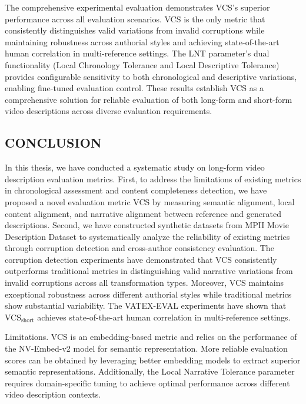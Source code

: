 \documentclass[main.tex]{subfiles}
\begin{document}
The comprehensive experimental evaluation demonstrates VCS's superior performance across all evaluation scenarios. VCS is the only metric that consistently distinguishes valid variations from invalid corruptions while maintaining robustness across authorial styles and achieving state-of-the-art human correlation in multi-reference settings. The LNT parameter's dual functionality (Local Chronology Tolerance and Local Descriptive Tolerance) provides configurable sensitivity to both chronological and descriptive variations, enabling fine-tuned evaluation control. These results establish VCS as a comprehensive solution for reliable evaluation of both long-form and short-form video descriptions across diverse evaluation requirements.

\subsection{CONCLUSION}

In this thesis, we have conducted a systematic study on long-form video description evaluation metrics. First, to address the limitations of existing metrics in chronological assessment and content completeness detection, we have proposed a novel evaluation metric VCS by measuring semantic alignment, local content alignment, and narrative alignment between reference and generated descriptions. Second, we have constructed synthetic datasets from MPII Movie Description Dataset to systematically analyze the reliability of existing metrics through corruption detection and cross-author consistency evaluation. The corruption detection experiments have demonstrated that VCS consistently outperforms traditional metrics in distinguishing valid narrative variations from invalid corruptions across all transformation types. Moreover, VCS maintains exceptional robustness across different authorial styles while traditional metrics show substantial variability. The VATEX-EVAL experiments have shown that VCS$_{\text{short}}$ achieves state-of-the-art human correlation in multi-reference settings.

Limitations. VCS is an embedding-based metric and relies on the performance of the NV-Embed-v2 model for semantic representation. More reliable evaluation scores can be obtained by leveraging better embedding models to extract superior semantic representations. Additionally, the Local Narrative Tolerance parameter requires domain-specific tuning to achieve optimal performance across different video description contexts.
\end{document}
